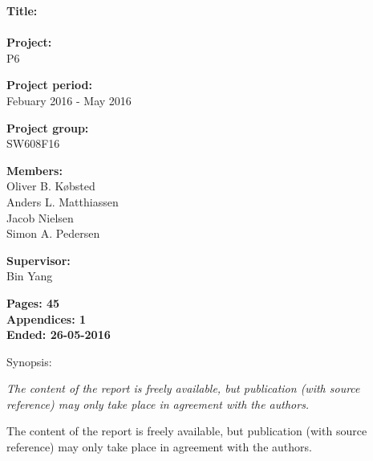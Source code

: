 \begin{minipage}[t]{0.48\textwidth}
\textbf{Title:} \\[5pt]\bigskip\hspace{2ex}    
\name\\
\textbf{Project:} \\[5pt]\bigskip\hspace{2ex}
P6

\textbf{Project period:} \\[5pt]\bigskip\hspace{2ex}
Febuary 2016 - May 2016

\textbf{Project group:} \\[5pt]\bigskip\hspace{2ex}
SW608F16

\textbf{Members:} \\[5pt]\hspace*{2ex}
Oliver B. Købsted \\\hspace*{2ex}
Anders L. Matthiassen \\\hspace*{2ex}
Jacob Nielsen \\\hspace*{2ex}
Simon A. Pedersen \\\hspace*{2ex}


\textbf{Supervisor:} \\[5pt]\hspace*{2ex}
Bin Yang


\vspace*{1cm}

\textbf{Pages: 45} \\
\textbf{Appendices: 1} \\
\textbf{Ended: 26-05-2016}

\end{minipage}
\hfill
\begin{minipage}[t]{0.483\textwidth}
Synopsis: \\[5pt]
\fbox{\parbox{7cm}{\bigskip\bigskip}}
\end{minipage}

\vfill

{\footnotesize\itshape The content of the report is freely available, but publication (with source reference) may only take place in agreement with the authors.}

The content of the report is freely available, but publication (with source reference) may only take place in agreement with the authors.
